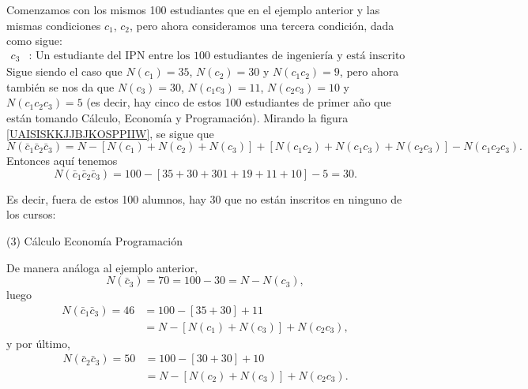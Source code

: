 \begin{myexample}
    Comenzamos con los mismos 100 estudiantes que en el ejemplo anterior y las mismas condiciones $c_1$, $c_2$, pero ahora consideramos una tercera condición, dada como sigue:
    \begin{align*}
        c_3 &: \text{ Un estudiante del IPN entre los 100 estudiantes de ingeniería y está inscrito en Programación.}
    \end{align*}
    Sigue siendo el caso que $N(c_1) = 35$, $N(c_2) = 30$ y $N(c_1 c_2) = 9$, pero ahora también se nos da que $N(c_3) = 30$, $N(c_1 c_3) = 11$, $N(c_2 c_3) = 10$ y $N(c_1 c_2 c_3) = 5$ (es decir, hay cinco de estos 100 estudiantes de primer año que están tomando Cálculo, Economía y Programación). Mirando la figura \ref{UAISISKKJJBJKOSPPIIW}, se sigue que
    $$N\left(\bar{c}_1 \bar{c}_2 \bar{c}_3\right) = N -\left[N\left(c_1\right) + N\left(c_2\right) + N\left(c_3\right)\right] + \left[N\left(c_1 c_2\right) + N\left(c_1 c_3\right) + N\left(c_2 c_3\right)\right] - N\left(c_1 c_2 c_3\right) .$$
    Entonces aquí tenemos
    $$N(\bar{c}_1 \bar{c}_2 \bar{c}_3) = 100 - [35 + 30 + 301 + 19 + 11 + 10] - 5 = 30.$$
    \begin{minipage}[l]{0.6\textwidth}
        Es decir, fuera de estos 100 alumnos, hay 30 que no están inscritos en ninguno de los cursos:
        \begin{tasks}[label=\roman*)](3)
            \task Cálculo
            \task Economía
            \task Programación
        \end{tasks}
        De manera análoga al ejemplo anterior,
        $$N (\bar{c}_3) = 70 = 100 - 30 = N - N(c_3),$$
        luego
        \begin{align*}
            N(\bar{c}_1 \bar{c}_3) = 46 & = 100 - [ 35 + 30] + 11 \\
            & = N - [N(c_1) + N(c_3)] + N(c_2 c_3),
        \end{align*}
        y por último,
        \begin{align*}
            N(\bar{c}_2 \bar{c}_3) = 50 & = 100 - [30 + 30] + 10 \\
            & = N - [N(c_2) + N(c_3)] + N(c_2 c_3).
        \end{align*}
    \end{minipage}~
    \begin{minipage}[r]{0.22\textwidth}
        \begin{center}
\end{center}
\end{minipage}
\end{myexample}

